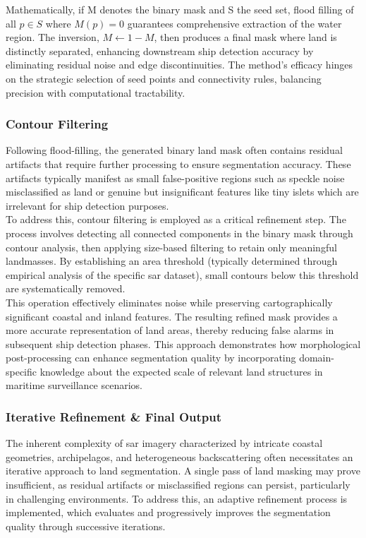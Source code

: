 \documentclass{article}
\begin{document}
	Mathematically, if M denotes the binary mask and S the seed set, flood filling of all $p \in  S$ where $M(p) = 0$ guarantees comprehensive extraction of the water region. The inversion, $M \leftarrow 1 - M$, then produces a final mask where land is distinctly separated, enhancing downstream ship detection accuracy by eliminating residual noise and edge discontinuities. The method’s efficacy hinges on the strategic selection of seed points and connectivity rules, balancing precision with computational tractability. 
	\subsubsection{Contour Filtering}
	
	Following flood-filling, the generated binary land mask often contains residual artifacts that require further processing to ensure segmentation accuracy. These artifacts typically manifest as small false-positive regions such as speckle noise misclassified as land or genuine but insignificant features like tiny islets which are irrelevant for ship detection purposes. \\
	
	To address this, contour filtering is employed as a critical refinement step. The process involves detecting all connected components in the binary mask through contour analysis, then applying size-based filtering to retain only meaningful landmasses. By establishing an area threshold (typically determined through empirical analysis of the specific \acrshort{sar} dataset), small contours below this threshold are systematically removed. \\
	
	This operation effectively eliminates noise while preserving cartographically significant coastal and inland features. The resulting refined mask provides a more accurate representation of land areas, thereby reducing false alarms in subsequent ship detection phases. This approach demonstrates how morphological post-processing can enhance segmentation quality by incorporating domain-specific knowledge about the expected scale of relevant land structures in maritime surveillance scenarios. 
	
	\subsubsection{Iterative Refinement \& Final Output}
	The inherent complexity of \acrshort{sar} imagery characterized by intricate coastal geometries, archipelagos, and heterogeneous backscattering often necessitates an iterative approach to land segmentation. A single pass of land masking may prove insufficient, as residual artifacts or misclassified regions can persist, particularly in challenging environments. To address this, an adaptive refinement process is implemented, which evaluates and progressively improves the segmentation quality through successive iterations.\\
	
\end{document}
